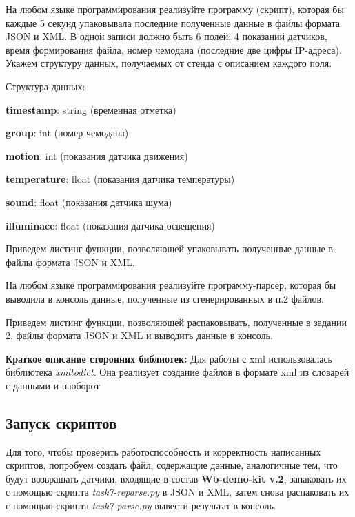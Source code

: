 \documentclass[a4paper,14pt]{extarticle}
\newcommand{\stend}{\textbf{Wb-demo-kit v.2}}
\begin{document}
\begin{problem}
На любом языке программирования реализуйте программу (скрипт), которая бы
каждые 5 секунд упаковывала последние полученные данные в файлы формата
JSON и XML. В одной записи должно быть 6 полей: 4 показаний датчиков, время
формирования файла, номер чемодана (последние две цифры IP-адреса).
\nonum 
Укажем структуру данных, получаемых от стенда с описанием каждого поля.

Структура данных:

\textbf{timestamp}: string (временная отметка)

\textbf{group}: int (номер чемодана)

\textbf{motion}: int (показания датчика движения)

\textbf{temperature}: float (показания датчика температуры)

\textbf{sound}: float (показания датчика шума)

\textbf{illuminace}: float (показания датчика освещения)


Приведем листинг функции, позволяющей упаковывать полученные данные в файлы формата JSON и XML.  

\end{problem}

\begin{problem}
На любом языке программирования реализуйте программу-парсер, которая бы
выводила в консоль данные, полученные из сгенерированных в п.2 файлов.

\nonum Приведем листинг функции, позволяющей распаковывать, полученные в задании 2, файлы формата JSON и XML и выводить данные в консоль.  

\end{problem}

\textbf{Краткое описание сторонних библиотек:}
Для работы с xml использовалась библиотека \textit{xmltodict}. Она реализует создание файлов в формате xml из словарей с данными и наоборот

\subsection{Запуск скриптов}
Для того, чтобы проверить работоспособность и корректность написанных скриптов, попробуем создать файл, содержащие данные, аналогичные тем, что будут возвращать датчики, входящие в состав \stend, запаковать их с помощью скрипта \textit{task7-reparse.py} в JSON и XML, затем снова распаковать их с помощью скрипта \textit{task7-parse.py} вывести результат в консоль.
\end{document}
